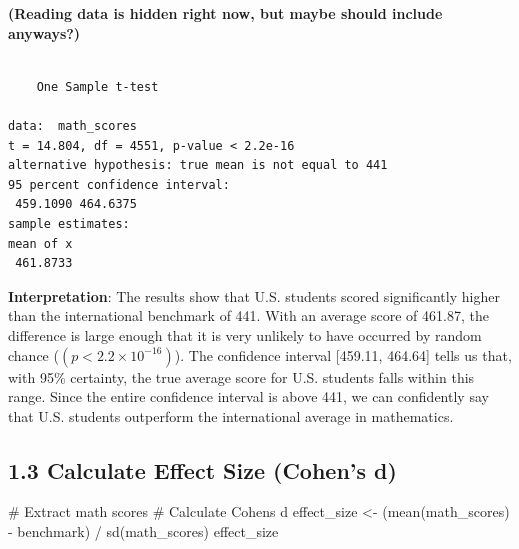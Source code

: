 \documentclass[
  letterpaper,
  DIV=11,
  numbers=noendperiod]{scrreprt}
\newenvironment{Shaded}{\begin{snugshade}}{\end{snugshade}}
\newcommand{\AttributeTok}[1]{\textcolor[rgb]{0.40,0.45,0.13}{#1}}
\newcommand{\CommentTok}[1]{\textcolor[rgb]{0.37,0.37,0.37}{#1}}
\newcommand{\DecValTok}[1]{\textcolor[rgb]{0.68,0.00,0.00}{#1}}
\newcommand{\FunctionTok}[1]{\textcolor[rgb]{0.28,0.35,0.67}{#1}}
\newcommand{\NormalTok}[1]{\textcolor[rgb]{0.00,0.23,0.31}{#1}}
\newcommand{\OtherTok}[1]{\textcolor[rgb]{0.00,0.23,0.31}{#1}}
\newcommand{\SpecialCharTok}[1]{\textcolor[rgb]{0.37,0.37,0.37}{#1}}
\newcommand{\StringTok}[1]{\textcolor[rgb]{0.13,0.47,0.30}{#1}}
\begin{document}
\textbf{(Reading data is hidden right now, but maybe should include
anyways?)}

\begin{Shaded}
\end{Shaded}

\begin{verbatim}

    One Sample t-test

data:  math_scores
t = 14.804, df = 4551, p-value < 2.2e-16
alternative hypothesis: true mean is not equal to 441
95 percent confidence interval:
 459.1090 464.6375
sample estimates:
mean of x 
 461.8733 
\end{verbatim}

\textbf{Interpretation}: The results show that U.S. students scored
significantly higher than the international benchmark of 441. With an
average score of 461.87, the difference is large enough that it is very
unlikely to have occurred by random chance
(\((p < 2.2 \times 10^{-16})\)). The confidence interval {[}459.11,
464.64{]} tells us that, with 95\% certainty, the true average score for
U.S. students falls within this range. Since the entire confidence
interval is above 441, we can confidently say that U.S. students
outperform the international average in mathematics.

\subsection*{1.3 Calculate Effect Size (Cohen's
d)}\label{calculate-effect-size-cohens-d}

\begin{Shaded}
\begin{Highlighting}[]
\CommentTok{\# Extract math scores }
\CommentTok{\# Calculate Cohen\textquotesingle{}s d }
\NormalTok{effect\_size }\OtherTok{\textless{}{-}}\NormalTok{ (}\FunctionTok{mean}\NormalTok{(math\_scores) }\SpecialCharTok{{-}}\NormalTok{ benchmark) }\SpecialCharTok{/} \FunctionTok{sd}\NormalTok{(math\_scores) }
\NormalTok{effect\_size }
\end{Highlighting}
\end{Shaded}
\end{document}
